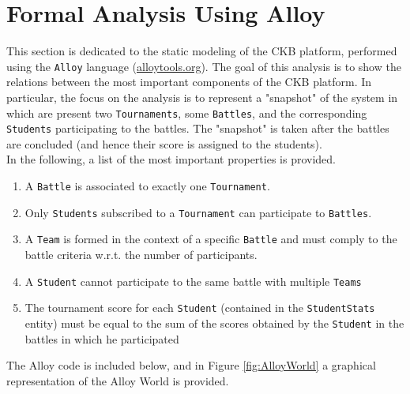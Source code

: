 \documentclass[a4paper, 11pt, titlepage]{article}
\begin{document}

\section{Formal Analysis Using Alloy}

This section is dedicated to the static modeling of the CKB platform, performed using the \texttt{Alloy} language (\href{https://alloytools.org/}{alloytools.org}). The goal of this analysis is to show the relations between the most important components of the CKB platform. In particular, the focus on the analysis is to represent a "snapshot" of the system in which are present two \texttt{Tournaments}, some \texttt{Battles}, and the corresponding \texttt{Students} participating to the battles. The "snapshot" is taken after the battles are concluded (and hence their score is assigned to the students).
\\
In the following, a list of the most important properties is provided.
\begin{enumerate}
    \item A \texttt{Battle} is associated to exactly one \texttt{Tournament}.
    \item Only \texttt{Students} subscribed to a \texttt{Tournament} can participate to \texttt{Battles}.
    \item A \texttt{Team} is formed in the context of a specific \texttt{Battle} and must comply to the battle criteria w.r.t. the number of participants.
    \item A \texttt{Student} cannot participate to the same battle with multiple \texttt{Teams}
    \item The tournament score for each \texttt{Student} (contained in the \texttt{StudentStats} entity) must be equal to the sum of the scores obtained by the \texttt{Student} in the battles in which he participated 
\end{enumerate}
The Alloy code is included below, and in Figure \ref{fig:AlloyWorld} a graphical representation of the Alloy World is provided.
\end{document}
